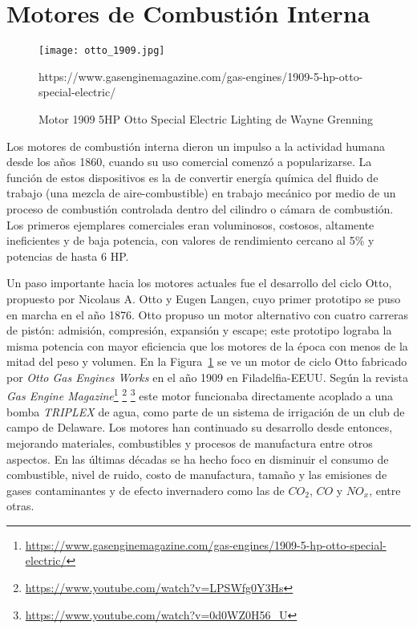 \section{Motores de Combustión Interna}

\begin{figure} \centering \texttt{[image: otto\_1909.jpg]}
    \caption{Motor 1909 5HP Otto Special Electric Lighting de Wayne
Grenning}\label{fig:otto1909} %
https://www.gasenginemagazine.com/gas-engines/1909-5-hp-otto-special-electric/
\end{figure}

Los motores de combustión interna dieron un impulso a la actividad humana desde
los años 1860, cuando su uso comercial comenzó a popularizarse.
%
La función de estos dispositivos es la de convertir energía química del fluido
de trabajo (una mezcla de aire-combustible) en trabajo mecánico por medio de un
proceso de combustión controlada dentro del cilindro o cámara de combustión.
%
Los primeros ejemplares comerciales eran voluminosos, costosos, altamente
ineficientes y de baja potencia, con valores de rendimiento cercano al 5\% y
potencias de hasta 6 HP.

Un paso importante hacia los motores actuales fue el desarrollo del ciclo Otto,
propuesto por Nicolaus A. Otto y Eugen Langen, cuyo primer prototipo se puso en
marcha en el año 1876.
%
Otto propuso un motor alternativo con cuatro carreras de pistón: admisión,
compresión, expansión y escape; este prototipo lograba la misma potencia con
mayor eficiencia que los motores de la época con menos de la mitad del peso y
volumen.
%
En la Figura~\ref{fig:otto1909} se ve un motor de ciclo Otto fabricado por
\emph{Otto Gas Engines Works} en el año 1909 en Filadelfia-EEUU.
%
Según la revista \emph{Gas Engine
Magazine}\footnote{\url{https://www.gasenginemagazine.com/gas-engines/1909-5-hp-otto-special-electric/}}
\footnote{ \url{https://www.youtube.com/watch?v=LPSWfg0Y3Hs} } \footnote{
\url{https://www.youtube.com/watch?v=0d0WZ0H56_U} } este motor funcionaba
directamente acoplado a una bomba \emph{TRIPLEX} de agua, como parte de un
sistema de irrigación de un club de campo de Delaware.
%
Los motores han continuado su desarrollo desde entonces, mejorando materiales,
combustibles y procesos de manufactura entre otros aspectos.
%
En las últimas décadas se ha hecho foco en disminuir el consumo de combustible,
nivel de ruido, costo de manufactura, tamaño y las emisiones de gases
contaminantes y de efecto invernadero como las de $CO_2$, $CO$ y $NO_x$, entre
otras.


